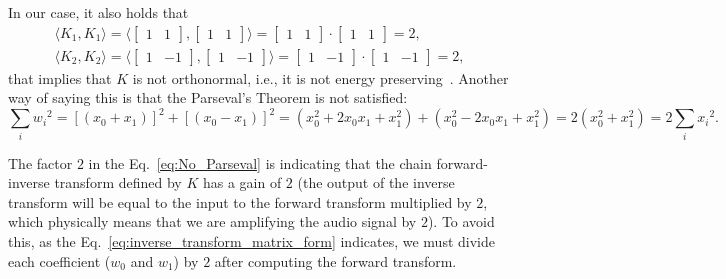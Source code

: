 In our case, it also holds that
\begin{equation}
\begin{array}{l}
  \langle K_1,K_1 \rangle =
  \langle \begin{bmatrix}
    1 & 1
  \end{bmatrix}
  ,
  \begin{bmatrix}
    1 & 1
  \end{bmatrix}
  \rangle =
  \begin{bmatrix}
    1 & 1
  \end{bmatrix}
  \cdot
  \begin{bmatrix}
    1 & 1
  \end{bmatrix}
   = 2,
   \\
     \langle K_2,K_2 \rangle =
  \langle \begin{bmatrix}
    1 & -1
  \end{bmatrix}
  ,
  \begin{bmatrix}
    1 & -1
  \end{bmatrix}
  \rangle =
  \begin{bmatrix}
    1 & -1
  \end{bmatrix}
  \cdot
  \begin{bmatrix}
    1 & -1
  \end{bmatrix}
   = 2,
   \end{array}
\end{equation}
that implies that $K$ is not orthonormal, i.e., it is not energy
preserving~\cite{sayood2017introduction}. Another way of saying this
is that the Parseval's Theorem is not satisfied:
\begin{equation}
  \sum_i {w_i}^2 =
  \left[(x_0+x_1)\right]^2 + \left[(x_0-x_1)\right]^2 =
  (x_0^2+2x_0x_1+x_1^2) + (x_0^2-2x_0x_1+x_1^2) =
  2(x_0^2+x_1^2) =
  2\sum_i {x_i}^2.
  \label{eq:No_Parseval}
\end{equation}


The factor $2$ in the Eq.~\ref{eq:No_Parseval} is indicating that the
chain forward-inverse transform defined by $K$ has a gain of $2$ (the
output of the inverse transform will be equal to the input to the
forward transform multiplied by $2$, which physically means that we
are amplifying the audio signal by $2$). To avoid this, as the
Eq.~\ref{eq:inverse_transform_matrix_form} indicates, we must divide
each coefficient ($w_0$ and $w_1$) by $2$ after computing the forward
transform.


